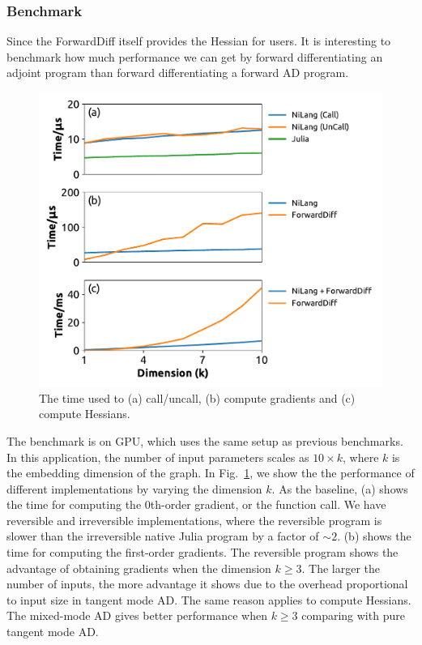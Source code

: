 \documentclass[aps,twocolumn,longbibliography,english,superscriptaddress]{revtex4-1}
\newcommand{\<}{\langle}
\renewcommand{\>}{\rangle}
\newcommand{\Fig}[1]{Fig.~\ref{#1}}
\theoremstyle{definition}\newtheorem{definition}{\textit{Definition}}
\begin{document}
\subsubsection{Benchmark}
Since the ForwardDiff itself provides the Hessian for users. It is interesting to benchmark how much performance we can get by forward differentiating an adjoint program than forward differentiating a forward AD program.
\begin{figure}
    \centerline{\includegraphics[width=\columnwidth,trim={0 0 0 0},clip]{images/fig7.pdf}}
    \caption{The time used to (a) call/uncall, (b) compute gradients and (c) compute Hessians.}\label{fig:bench-embedding}
\end{figure}
The benchmark is on GPU, which uses the same setup as previous benchmarks.
In this application, the number of input parameters scales as $10 \times k$, where $k$ is the embedding dimension of the graph.
In \Fig{fig:bench-embedding}, we show the the performance of different implementations by varying the dimension $k$.
As the baseline, (a) shows the time for computing the 0th-order gradient, or the function call. We have reversible and irreversible implementations, where the reversible program is slower than the irreversible native Julia program by a factor of $\sim2$.
(b) shows the time for computing the first-order gradients. The reversible program shows the advantage of obtaining gradients when the dimension $k \geq 3$. The larger the number of inputs, the more advantage it shows due to the overhead proportional to input size in tangent mode AD.
The same reason applies to compute Hessians. The mixed-mode AD gives better performance when $k \geq 3$ comparing with pure tangent mode AD.
\end{document}
